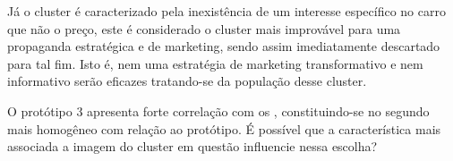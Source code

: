 Já o cluster \emph{\nomeCc{} }é caracterizado pela inexistência de
um interesse específico no carro que não o preço, este é considerado
o cluster mais improvável para uma propaganda estratégica e de marketing,
sendo assim imediatamente descartado para tal fim. Isto é, nem uma
estratégia de marketing transformativo e nem informativo serão eficazes
tratando-se da população desse cluster.

O protótipo 3 apresenta forte correlação com os \emph{\nomeCb{}},
constituindo-se no segundo mais homogêneo com relação ao protótipo.
É possível que a característica mais associada a imagem do cluster
em questão influencie nessa escolha? 
\begin{figure}[h]
\begin{centering}
\par\end{centering}


\end{figure}
